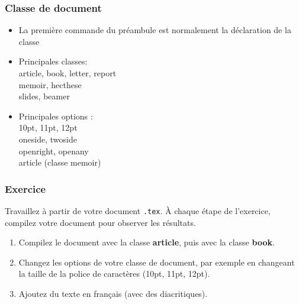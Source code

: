 
\begin{frame}[fragile]

	\frametitle{Classe de document}
	
	\begin{itemize}
		\item La première commande du préambule est normalement la déclaration de la classe
	\begin{codesource}
	\documentclass[options]{classe}
	\end{codesource}
				
		\pause
		
		\item Principales classes: \\
			article, book, letter, report \\
			memoir, hecthese \\
			slides, beamer
		
		\pause
		
		\item Principales options : \\
			10pt, 11pt, 12pt \\
			oneside, twoside \\
			openright, openany \\
			article (classe memoir)
	\end{itemize}
\end{frame}


\begin{frame}[c]

\frametitle{Exercice \thenoExercice}

Travaillez à partir de votre document \texttt{.tex}. À chaque étape de l'exercice, compilez votre
document pour observer les résultats.

\begin{enumerate}
	\item Compilez le document avec la classe \textbf{article}, puis avec la classe
		\textbf{book}.
	\item Changez les options de votre classe de document, par exemple en changeant la taille de la
		police de caractères (10pt, 11pt, 12pt).
	\item Ajoutez du texte en français (avec des diacritiques).
\end{enumerate}
\end{frame}

